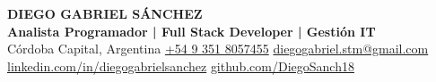 \noindent
\begin{minipage}[c]{0.78\textwidth}
    {\fontsize{21pt}{23pt}\selectfont\bfseries\color{primary}DIEGO GABRIEL \color{accent}SÁNCHEZ}\\[3pt]
    {\large\color{secondary}\textbf{Analista Programador | Full Stack Developer | Gestión IT}}\\[4.5pt]
    {\footnotesize\color{textcol}
        \faMapMarker*\hspace{3pt}Córdoba Capital, Argentina\hspace{8pt}
        \faPhone*\hspace{3pt}\href{tel:+5493518057455}{+54 9 351 8057455}\hspace{8pt}
        \faEnvelope\hspace{3pt}\href{mailto:diegogabriel.stm@gmail.com}{diegogabriel.stm@gmail.com}\\[2pt]
        \faLinkedin\hspace{3pt}\href{https://linkedin.com/in/diegogabrielsanchez}{linkedin.com/in/diegogabrielsanchez}\hspace{8pt}
        \faGithub\hspace{3pt}\href{https://github.com/DiegoSanch18}{github.com/DiegoSanch18}
    }
\end{minipage}%
\hfill
\begin{minipage}[c]{0.20\textwidth}
    \raggedleft
\end{minipage}
\vspace{2pt}
